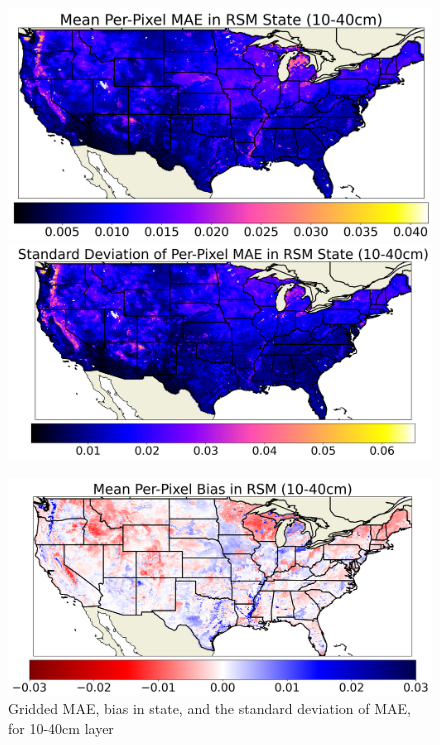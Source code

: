 \begin{figure}[hp!]
    \centering

    \includegraphics[width=.48\linewidth,draft=false]{figures/grid-eval_lstm-rsm-9_full/eval-grid_full_lstm-rsm-9_rsm-40_spatial-stats_abs-err_state-err-abs-mean.png}
    \includegraphics[width=.48\linewidth,draft=false]{figures/grid-eval_lstm-rsm-9_full/eval-grid_full_lstm-rsm-9_rsm-40_spatial-stats_abs-err_state-err-abs-stdev.png}

    \includegraphics[width=.48\linewidth,draft=false]{figures/grid-eval_lstm-rsm-9_full/eval-grid_full_lstm-rsm-9_rsm-40_spatial-stats_bias_state-err-bias-mean.png}

    \caption{Gridded MAE, bias in state, and the standard deviation of MAE, for 10-40cm layer}
    \label{lstm-rsm-9-grid-rsm-40}
\end{figure}

